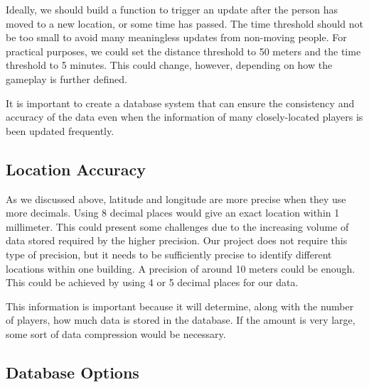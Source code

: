 \documentclass[conference]{IEEEtran}
\begin{document}
Ideally, we should build a function to trigger an update after the person has moved to a new location, or some time has passed. The time threshold should not be too small to avoid many meaningless updates from non-moving people. For practical purposes, we could set the distance threshold to 50 meters and the time threshold to 5 minutes. This could change, however, depending on how the gameplay is further defined.  

It is important to create a database system that can ensure the consistency and accuracy of the data even when the information of many closely-located players is been updated frequently. 

\subsection{Location Accuracy} 

As we discussed above, latitude and longitude are more precise when they use more decimals. Using 8 decimal places would give an exact location within 1 millimeter. This could present some challenges due to the increasing volume of data stored required by the higher precision. Our project does not require this type of precision, but it needs to be sufficiently precise to identify different locations within one building. A precision of around 10 meters could be enough. This could be achieved by using 4 or 5 decimal places for our data. 

This information is important because it will determine, along with the number of players, how much data is stored in the database. If the amount is very large, some sort of data compression would be necessary.

\subsection{Database Options}
\end{document}
